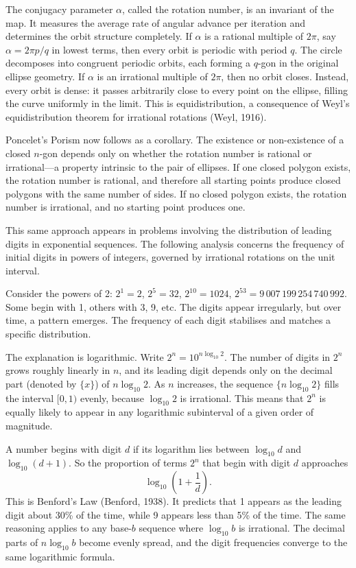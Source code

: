 The conjugacy parameter $\alpha$, called the rotation number, is an invariant of the map. It measures the average rate of angular advance per iteration and determines the orbit structure completely. If $\alpha$ is a rational multiple of $2\pi$, say $\alpha = 2\pi p/q$ in lowest terms, then every orbit is periodic with period $q$. The circle decomposes into congruent periodic orbits, each forming a $q$-gon in the original ellipse geometry. If $\alpha$ is an irrational multiple of $2\pi$, then no orbit closes. Instead, every orbit is dense: it passes arbitrarily close to every point on the ellipse, filling the curve uniformly in the limit. This is equidistribution, a consequence of Weyl's equidistribution theorem for irrational rotations (Weyl, 1916).

Poncelet's Porism now follows as a corollary. The existence or non-existence of a closed $n$-gon depends only on whether the rotation number is rational or irrational—a property intrinsic to the pair of ellipses. If one closed polygon exists, the rotation number is rational, and therefore all starting points produce closed polygons with the same number of sides. If no closed polygon exists, the rotation number is irrational, and no starting point produces one.

This same approach appears in problems involving the distribution of leading digits in exponential sequences. The following analysis concerns the frequency of initial digits in powers of integers, governed by irrational rotations on the unit interval.

Consider the powers of 2: $2^1 = 2$, $2^5 = 32$, $2^{10} = 1024$, $2^{53} = 9{\,}007{\,}199{\,}254{\,}740{\,}992$. Some begin with 1, others with 3, 9, etc. The digits appear irregularly, but over time, a pattern emerges. The frequency of each digit stabilises and matches a specific distribution.

The explanation is logarithmic. Write $2^n = 10^{n \log_{10} 2}$. The number of digits in $2^n$ grows roughly linearly in $n$, and its leading digit depends only on the decimal part (denoted by $\{x\}$) of $n \log_{10} 2$. As $n$ increases, the sequence $\{ n \log_{10} 2 \}$ fills the interval $[0,1)$ evenly, because $\log_{10} 2$ is irrational. This means that $2^n$ is equally likely to appear in any logarithmic subinterval of a given order of magnitude.

A number begins with digit $d$ if its logarithm lies between $\log_{10} d$ and $\log_{10}(d+1)$. So the proportion of terms $2^n$ that begin with digit $d$ approaches
\[
\log_{10}\left(1 + \frac{1}{d}\right).
\]
This is Benford’s Law (Benford, 1938). It predicts that 1 appears as the leading digit about 30\% of the time, while 9 appears less than 5\% of the time. The same reasoning applies to any base-$b$ sequence where $\log_{10} b$ is irrational. The decimal parts of $n \log_{10} b$ become evenly spread, and the digit frequencies converge to the same logarithmic formula.

